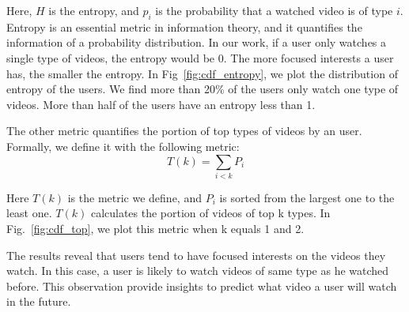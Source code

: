 Here, $H$ is the entropy, and $p_i$ is the probability that a watched
video is of type $i$.  Entropy is an essential metric in information
theory, and it quantifies the information of a probability
distribution. In our work, if a user only watches a single type of
videos, the entropy would be 0. The more focused interests a user has,
the smaller the entropy. In Fig~\ref{fig:cdf_entropy}, we plot the
distribution of entropy of the users. We find more than 20\% of the
users only watch one type of videos. More than half of the users have
an entropy less than 1. 

The other metric quantifies the portion of top types of videos by an
user. Formally, we define it with the following metric:
\begin{equation}
T(k)=\sum_{i<k} P_{i}
\end{equation}

Here $T(k)$ is the metric we  define, and $P_{i}$ is sorted from the
largest one to the least one. $T(k)$ calculates the portion of videos
of top k types. In Fig.~\ref{fig:cdf_top}, we plot this metric when k
equals 1 and 2. 



The results reveal that users tend to have focused interests on the
videos they watch. In this case, a user is likely to watch videos of
same type as he watched before. This observation provide insights to
predict what video a user will watch in the future.

